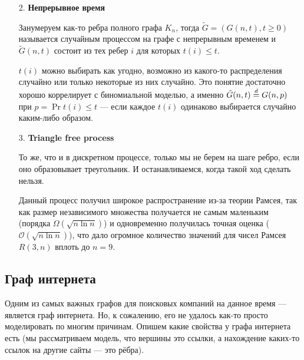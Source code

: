 \begin{itemize}
  \item[2.] \textbf{Непрерывное время}

  \begin{definition}
    Занумеруем как-то ребра полного графа $K_n$, тогда $\tilde{G} = (G(n, t), t \geq 0)$
    называется случайным процессом на графе с непрерывным временем и $\tilde{G}(n, t)$
    состоит из тех ребер $i$ для которых $t(i) \leq t$.
  \end{definition}

  $t(i)$ можно выбирать как угодно, возможно из какого-то распределения случайно
  или только некоторые из них случайно. Это понятие достаточно хорошо коррелирует
  с биномиальной моделью, а именно $\tilde{G}(n, t) \overset{d}{=} G(n, p)$ при $p = 
  \Pr{t(i) \leq t}$ --- если каждое $t(i)$ одинаково выбирается случайно каким-либо
  образом.

  \item[3.] \textbf{Triangle free process}

  То же, что и в дискретном процессе, только мы не берем на шаге ребро, если
  оно образовывает треугольник. И останавливаемся, когда такой ход сделать нельзя.

  Данный процесс получил широкое распространение из-за теории Рамсея, так как
  размер независимого множества получается не самым маленьким (порядка $\Omega(\sqrt{n \ln n})$) и
  одновременно получилась точная оценка ($\mathcal{O}(\sqrt{n \ln n})$), что дало огромное
  количество значений для чисел Рамсея $R(3, n)$ вплоть до $n = 9$.
\end{itemize}

\subsection{Граф интернета}

Одним из самых важных графов для поисковых компаний на данное время --- является
граф интернета. Но, к сожалению, его не удалось как-то просто моделировать по многим
причинам. Опишем какие свойства у графа интернета есть (мы рассматриваем модель,
что вершины это ссылки, а нахождение каких-то ссылок на другие сайты --- это рёбра).

